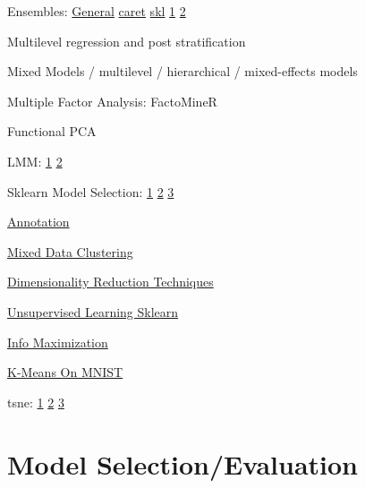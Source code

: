 \documentclass[]{book}
\begin{document}
Ensembles: \href{http://mlwave.com/kaggle-ensembling-guide/}{General}
\textbar{} \href{http://amunategui.github.io/blending-models/}{caret}
\textbar{}
\href{https://www.toptal.com/machine-learning/ensemble-methods-machine-learning}{skl}
\textbar{}
\href{http://blog.kaggle.com/2016/12/27/a-kagglers-guide-to-model-stacking-in-practice/}{1}
\textbar{}
\href{http://blog.kaggle.com/2017/06/15/stacking-made-easy-an-introduction-to-stacknet-by-competitions-grandmaster-marios-michailidis-kazanova/}{2}

Multilevel regression and post stratification

Mixed Models / multilevel / hierarchical / mixed-effects models

Multiple Factor Analysis: FactoMineR

Functional PCA

LMM:
\href{http://edwardlib.org/tutorials/linear-mixed-effects-models}{1}
\textbar{}
\href{https://ourcodingclub.github.io/2017/03/15/mixed-models.html}{2}

Sklearn Model Selection:
\href{http://scikit-learn.org/stable/modules/generated/sklearn.model_selection.GroupKFold.html}{1}
\textbar{}
\href{http://scikit-learn.org/stable/modules/generated/sklearn.model_selection.LeaveOneGroupOut.html}{2}
\textbar{}
\href{http://scikit-learn.org/stable/modules/generated/sklearn.model_selection.LeavePGroupsOut.html}{3}

\href{https://explosion.ai/blog/prodigy-annotation-tool-active-learning}{Annotation}

\href{https://www.r-bloggers.com/clustering-mixed-data-types-in-r/}{Mixed
Data Clustering}

\href{https://colah.github.io/posts/2014-10-Visualizing-MNIST/}{Dimensionality
Reduction Techniques}

\href{http://opensource.datacratic.com/mtlpy50/}{Unsupervised Learning
Sklearn}

\href{http://www.inference.vc/unsupervised-learning-by-predicting-noise-an-information-maximization-view-2/}{Info
Maximization}

\href{http://johnloeber.com/docs/kmeans.html}{K-Means On MNIST}

tsne: \href{http://distill.pub/2016/misread-tsne/}{1} \textbar{}
\href{https://lvdmaaten.github.io/tsne/}{2} \textbar{}
\href{https://index.pocketcluster.io/harveyslash-tsne-embedding-visualisation.html}{3}

\section{Model Selection/Evaluation}\label{model-selectionevaluation}
\end{document}
